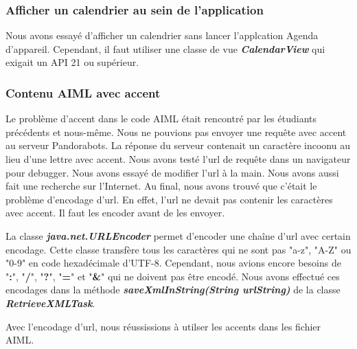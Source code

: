 \subsubsection*{Afficher un calendrier au sein de l'application}

\indent Nous avons essayé d'afficher un calendrier sans lancer l'applcation Agenda d'appareil. Cependant, il faut utiliser une classe de vue \textbf{\emph{CalendarView}} qui exigait un API 21 ou supérieur.

\subsubsection{Contenu AIML avec accent}

\indent Le problème d'accent dans le code AIML était rencontré par les étudiants précédents et nous-même. Nous ne pouvions pas envoyer une requête avec accent au serveur Pandorabots. La réponse du serveur contenait un caractère incoonu au lieu d'une lettre avec accent. Nous avons testé l'url de requête dans un navigateur pour debugger. Nous avons essayé de modifier l'url à la main. Nous avons aussi fait une recherche sur l'Internet. Au final, nous avons trouvé que c'était le problème d'encodage d'url. En effet, l'url ne devait pas contenir les caractères avec accent. Il faut les encoder avant de les envoyer.

\indent La classe \textbf{\emph{java.net.URLEncoder}} permet d'encoder une chaîne d'url avec certain encodage. Cette classe transfère tous les caractères qui ne sont pas "a-z", "A-Z" ou "0-9" en code hexadécimale d'UTF-8. Cependant, nous avions encore besoins de "\textbf{:}", "\textbf{/}", "\textbf{?}", "\textbf{=}" et "\textbf{\&}" qui ne doivent pas être encodé. Nous avons effectué ces encodages dans la méthode \textbf{\emph{saveXmlInString(String urlString)}} de la classe \textbf{\emph{RetrieveXMLTask}}. 

\indent Avec l'encodage d'url, nous réussissions à utilser les accents dans les fichier AIML.

\newpage
